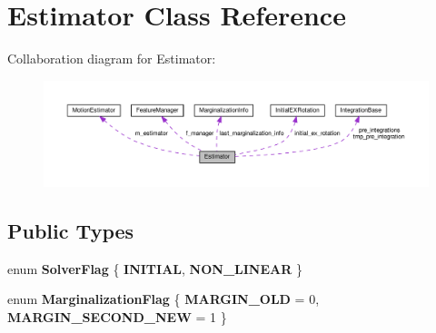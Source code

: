 \hypertarget{classEstimator}{}\section{Estimator Class Reference}
\label{classEstimator}


Collaboration diagram for Estimator\+:\nopagebreak
\begin{figure}[H]
\begin{center}
\leavevmode
\includegraphics[width=350pt]{classEstimator__coll__graph}
\end{center}
\end{figure}
\subsection*{Public Types}
\begin{DoxyCompactItemize}
\item 
\mbox{\label{classEstimator_ae4545de83f6d64233515112f7ff27628}} 
enum {\bfseries Solver\+Flag} \{ {\bfseries I\+N\+I\+T\+I\+AL}, 
{\bfseries N\+O\+N\+\_\+\+L\+I\+N\+E\+AR}
 \}
\item 
\mbox{\label{classEstimator_a020181ad0fe1f065d5ea8a4d414ce6b1}} 
enum {\bfseries Marginalization\+Flag} \{ {\bfseries M\+A\+R\+G\+I\+N\+\_\+\+O\+LD} = 0, 
{\bfseries M\+A\+R\+G\+I\+N\+\_\+\+S\+E\+C\+O\+N\+D\+\_\+\+N\+EW} = 1
 \}
\end{DoxyCompactItemize}
